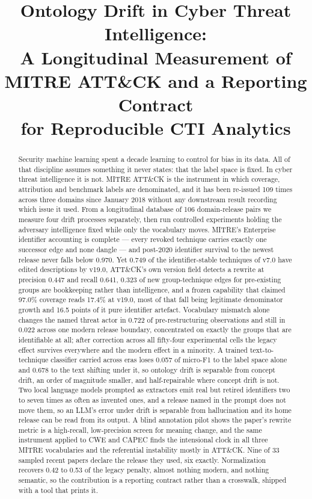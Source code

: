 \documentclass[11pt,a4paper]{article}
\title{Ontology Drift in Cyber Threat Intelligence:\\
A Longitudinal Measurement of MITRE ATT\&CK and a Reporting Contract\\
for Reproducible CTI Analytics}
\date{}
\begin{document}
\maketitle

\begin{abstract}


Security machine learning spent a decade learning to control for bias in its data. All of that discipline assumes something it never states: that the label space is fixed. In cyber threat intelligence it is not. MITRE ATT\&CK is the instrument in which coverage, attribution and benchmark labels are denominated, and it has been re-issued 109 times across three domains since January 2018 without any downstream result recording which issue it used. From a longitudinal database of 106 domain-release pairs we measure four drift processes separately, then run controlled experiments holding the adversary intelligence fixed while only the vocabulary moves. MITRE's Enterprise identifier accounting is complete — every revoked technique carries exactly one successor edge and none dangle — and post-2020 identifier survival to the newest release never falls below 0.970. Yet 0.749 of the identifier-stable techniques of v7.0 have edited descriptions by v19.0, ATT\&CK's own version field detects a rewrite at precision 0.447 and recall 0.641, 0.323 of new group-technique edges for pre-existing groups are bookkeeping rather than intelligence, and a frozen capability that claimed 97.0\% coverage reads 17.4\% at v19.0, most of that fall being legitimate denominator growth and 16.5 points of it pure identifier artefact. Vocabulary mismatch alone changes the named threat actor in 0.722 of pre-restructuring observations and still in 0.022 across one modern release boundary, concentrated on exactly the groups that are identifiable at all; after correction across all fifty-four experimental cells the legacy effect survives everywhere and the modern effect in a minority. A trained text-to-technique classifier carried across eras loses 0.057 of micro-F1 to the label space alone and 0.678 to the text shifting under it, so ontology drift is separable from concept drift, an order of magnitude smaller, and half-repairable where concept drift is not. Two local language models prompted as extractors emit real but retired identifiers two to seven times as often as invented ones, and a release named in the prompt does not move them, so an LLM's error under drift is separable from hallucination and its home release can be read from its output. A blind annotation pilot shows the paper's rewrite metric is a high-recall, low-precision screen for meaning change, and the same instrument applied to CWE and CAPEC finds the intensional clock in all three MITRE vocabularies and the referential instability mostly in ATT\&CK. Nine of 33 sampled recent papers declare the release they used, six exactly. Normalization recovers 0.42 to 0.53 of the legacy penalty, almost nothing modern, and nothing semantic, so the contribution is a reporting contract rather than a crosswalk, shipped with a tool that prints it.

\end{abstract}
\end{document}
